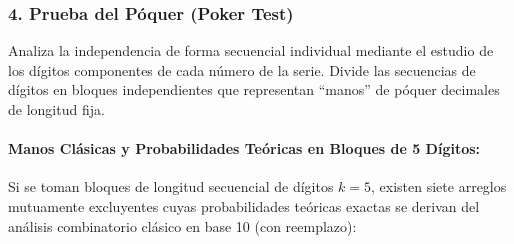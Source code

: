 \documentclass{article}
\begin{document}
\subsubsection{4. Prueba del Póquer (Poker Test)}
Analiza la independencia de forma secuencial individual mediante el estudio de los dígitos componentes de cada número de la serie. Divide las secuencias de dígitos en bloques independientes que representan ``manos'' de póquer decimales de longitud fija.

\paragraph{Manos Clásicas y Probabilidades Teóricas en Bloques de 5 Dígitos:}
Si se toman bloques de longitud secuencial de dígitos $k = 5$, existen siete arreglos mutuamente excluyentes cuyas probabilidades teóricas exactas se derivan del análisis combinatorio clásico en base 10 (con reemplazo):
\end{document}
